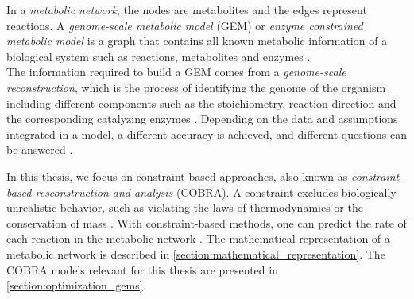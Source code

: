 In a \textit{metabolic network}, the nodes are metabolites %
and the edges represent reactions. 
A \textit{genome-scale metabolic model} (GEM) or \textit{enzyme constrained metabolic model} is a graph that contains all known metabolic information of a biological system such as reactions, metabolites and enzymes \cite{GEMs}.\\ 
The information required to build a GEM comes from a \textit{genome-scale reconstruction}, which is the process of identifying the genome of the organism including different components such as the stoichiometry, reaction direction and the corresponding catalyzing enzymes \cite{fba_applications_and_challenges} . 
Depending on the data and assumptions integrated in a model, a different accuracy is achieved, and different questions can be answered \cite{fba_applications_and_challenges}. 

In this thesis, we focus on constraint-based approaches, also known as \textit{constraint-based resconstruction and analysis} (COBRA). A constraint excludes biologically unrealistic behavior, such as violating the laws of thermodynamics or the conservation of mass \cite{intro_computational_systems_biology}.
With constraint-based methods, one can predict the 
rate of each reaction in the metabolic network \cite{intro_computational_systems_biology}.
The mathematical representation of a metabolic network is described in \cref{section:mathematical_representation}.
The COBRA models relevant for this thesis are presented in \cref{section:optimization_gems}.

